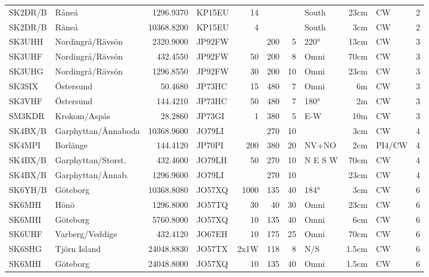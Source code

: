 \begin{longtable}{llrlrrrlrll}
	SK2DR/B  & Råneå               &  1296.9370 & KP15EU &   14 &      &      & South   &  23cm & CW     & 2    \\
	SK2DR/B  & Råneå               & 10368.8200 & KP15EU &    4 &      &      & South   &   3cm & CW     & 2    \\
	SK3UHH   & Nordingrå/Rävsön    &  2320.9000 & JP92FW &      &  200 &    5 & 220°    &  13cm & CW     & 3    \\
	SK3UHF   & Nordingrå/Rävsön    &   432.4550 & JP92FW &   50 &  200 &    8 & Omni    &  70cm & CW     & 3    \\
	SK3UHG   & Nordingrå/Rävsön    &  1296.8550 & JP92FW &   30 &  200 &   10 & Omni    &  23cm & CW     & 3    \\
	SK3SIX   & Östersund           &    50.4680 & JP73HC &   15 &  480 &    7 & Omni    &    6m & CW     & 3    \\
	SK3VHF   & Östersund           &   144.4210 & JP73HC &   50 &  480 &    7 & 180°    &    2m & CW     & 3    \\
	SM3KDR   & Krokom/Aspås        &    28.2860 & JP73GI &    1 &  380 &    5 & E-W     &   10m & CW     & 3    \\
	SK4BX/B  & Garphyttan/Ånnaboda & 10368.9600 & JO79LI &      &  270 &   10 &         &   3cm & CW     & 4    \\
	SK4MPI   & Borlänge            &   144.4120 & JP70PI &  200 &  380 &   20 & NV+NO   &   2cm & PI4/CW & 4    \\
	SK4BX/B  & Garphyttan/Storst.  &   432.4600 & JO79LH &   50 &  270 &   10 & N E S W &  70cm & CW     & 4    \\
	SK4BX/B  & Garphyttan/Ånnab.   &  1296.9600 & JO79LI &      &  270 &   10 &         &  23cm & CW     & 4    \\
	SK6YH/B  & Göteborg            & 10368.8080 & JO57XQ & 1000 &  135 &   40 & 184°    &   3cm & CW     & 6    \\
	SK6MHI   & Hönö                &  1296.8000 & JO57TQ &   30 &   40 &   30 & Omni    &  23cm & CW     & 6    \\
	SK6MHI   & Göteborg            &  5760.8000 & JO57XQ &   10 &  135 &   40 & Omni    &   6cm & CW     & 6    \\
	SK6UHF   & Varberg/Veddige     &   432.4120 & JO67EH &   10 &  175 &   25 & Omni    &  70cm & CW     & 6    \\
	SK6SHG   & Tjörn Island        & 24048.8830 & JO57TX & 2x1W &  118 &    8 & N/S     & 1.5cm & CW     & 6    \\
	SK6MHI   & Göteborg            & 24048.8000 & JO57XQ &   10 &  135 &   40 & Omni    & 1.5cm & CW     & 6    \\

\end{longtable}
